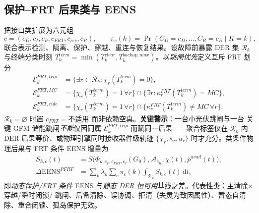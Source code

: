 \subsection{保护--FRT 后果类与 EENS}\label{sec:rel-pf-consequence}
把接口类扩展为六元组
\begin{equation}
 c=(c_D,c_I,c_P,c_{FRT},c_{rec},c_R),\qquad
 \pi_c(k)=\Pr(C_D{=}c_D,\dots,C_R{=}c_R\mid K{=}k),
\end{equation}
联合表示检测、隔离、保护、穿越、重连与恢复结果。设故障前暴露 DER 集 $\mathcal R_k$ 与终端分类时刻
$T_k^{term}=\min(T_k^{clear},T_k^{backup,max})$。以\emph{跳闸优先}定义互斥 FRT 划分
\begin{align}
 \mathcal E_k^{FRT,trip}&=\{\exists r\in\mathcal R_k:\chi_r(T_k^{term})=0\},\\
 \mathcal E_k^{FRT,MC}&=\{\chi_r(T_k^{term}){=}1\,\forall r\}\cap\{\exists r:\kappa_r^{FRT}(T_k^{term})=MC\},\\
 \mathcal E_k^{FRT,ride}&=\{\chi_r(T_k^{term}){=}1\,\forall r\}\cap\{\kappa_r^{FRT}(T_k^{term})\ne MC\,\forall r\};
\end{align}
$\mathcal R_k=\varnothing$ 时置 $c_{FRT}=\text{不适用}$ 而非依赖空真。\textbf{关键警示}：一台小光伏跳闸与一台
关键 GFM 储能跳闸\emph{不能}仅因同属 $\mathcal E_k^{FRT,trip}$ 而赋同一后果——聚合标签仅在 $\mathcal R_k$ 内
DER 后果等价、或物理引擎同时接收器件级轨迹 $\{\chi_r,\kappa_r,a_r\}$ 时才充分。类条件物理后果与 FRT 条件
EENS 增量为
\begin{equation}
\begin{aligned}
 S_{k,c}(t)&=S\big(\Phi_{k,c_P,c_{FRT},c_I}(G_0),\mathcal A_{c_R},
   \chi(t),\overline p^{avail}(t)\big),\\
 \Delta\mathrm{EENS}^{PFRT}&=\sum_k\lambda_k\!\sum_c\pi_c(k)
   \!\int_{\mathcal T_k}\!S_{k,c}(t)\,\mathrm dt,
\end{aligned}
\end{equation}
即\emph{动态保护/FRT 条件} EENS 与\emph{静态 DER 恒可用}基线之差。代表性类：主清除$\times$穿越/瞬时闭锁/
跳闸、后备清除、误协调、拒清（失灵为致因属性）、暂态自清除、重合闭锁、孤岛保护无效。

